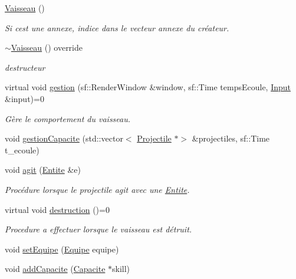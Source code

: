 \begin{DoxyCompactItemize}
\item 
\hyperlink{class_vaisseau_a86378a70f0d92fcc6c5c5973574b2b7d}{Vaisseau} ()
\begin{DoxyCompactList}\small\item\em Si c\textquotesingle{}est une annexe, indice dans le vecteur annexe du créateur. \end{DoxyCompactList}\item 
\hyperlink{class_vaisseau_a3360bd62af7a7aaf5732b86d639a0674}{$\sim$\+Vaisseau} () override
\begin{DoxyCompactList}\small\item\em destructeur \end{DoxyCompactList}\item 
virtual void \hyperlink{class_vaisseau_afaa179c1f03255d7869b8e2296ed8307}{gestion} (sf\+::\+Render\+Window \&window, sf\+::\+Time temps\+Ecoule, \hyperlink{_input_8h_a5588d60d674991c719a8df848313e966}{Input} \&input)=0
\begin{DoxyCompactList}\small\item\em Gère le comportement du vaisseau. \end{DoxyCompactList}\item 
void \hyperlink{class_vaisseau_a21fbd13a4fad50af3ae34a36dbcb6820}{gestion\+Capacite} (std\+::vector$<$ \hyperlink{class_projectile}{Projectile} $\ast$$>$ \&projectiles, sf\+::\+Time t\+\_\+ecoule)
\item 
void \hyperlink{class_vaisseau_a0cd6733845f221c2a5a9d7ccd7f43137}{agit} (\hyperlink{class_entite}{Entite} \&e)
\begin{DoxyCompactList}\small\item\em Procédure lorsque le projectile agit avec une \hyperlink{class_entite}{Entite}. \end{DoxyCompactList}\item 
virtual void \hyperlink{class_vaisseau_af4f490c5fd9e171b23067ec73aa737ad}{destruction} ()=0
\begin{DoxyCompactList}\small\item\em Procedure a effectuer lorsque le vaisseau est détruit. \end{DoxyCompactList}\item 
void \hyperlink{class_vaisseau_a507c16e2f4584e544178e27f0acc29d9}{set\+Equipe} (\hyperlink{constantes_8h_a08fa5554288d5031a8f3bb83cc04ee83}{Equipe} equipe)
\item 
void \hyperlink{class_vaisseau_a04d7069231187e7dba26a06a0aaf2508}{add\+Capacite} (\hyperlink{class_capacite}{Capacite} $\ast$skill)
$$
\end{DoxyCompactItemize}
